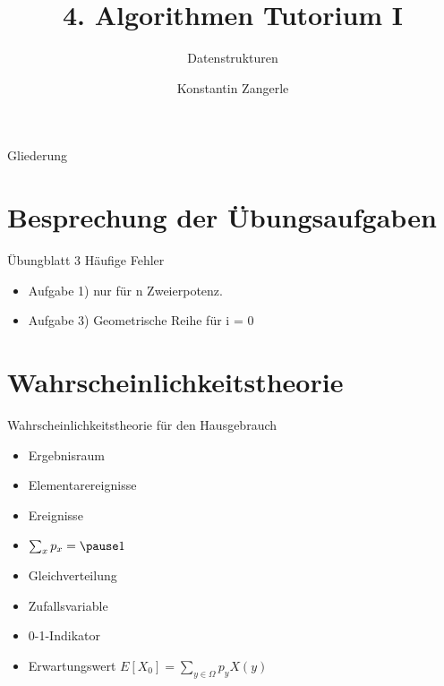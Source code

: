 \documentclass[18pt]{beamer}
\title[Algo I Tut]{4. Algorithmen Tutorium I}
\subtitle{Datenstrukturen}
\author[Zangerle]{Konstantin Zangerle}
\institute{Institut für Theoretische Informatik}
\begin{document}

\begin{frame}
\titlepage
\end{frame}

\begin{frame}{Gliederung}
 \tableofcontents
\end{frame}


\section{Besprechung der Übungsaufgaben}
\begin{frame}{Übungblatt 3}
Häufige Fehler
\begin{itemize}
 \item Aufgabe 1) nur für n Zweierpotenz.
 \item Aufgabe 3) Geometrische Reihe für i = 0 
\end{itemize}
\end{frame}

\section{Wahrscheinlichkeitstheorie}
\begin{frame}{Wahrscheinlichkeitstheorie für den Hausgebrauch}
 \begin{itemize}
  \item Ergebnisraum
  \item Elementarereignisse
  \item Ereignisse
  \item $\sum_x p_x = \pause 1$
  \item Gleichverteilung
  \item Zufallsvariable
  \item 0-1-Indikator
  \item Erwartungswert \pause $E[X_0] = \sum_{y \in \Omega} p_y X(y)$
 \end{itemize}

\end{frame}
\end{document}
